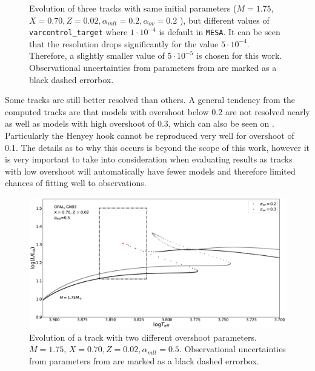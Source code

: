 \begin{figure}[htbp]
    \centering
    \caption{Evolution of three tracks with same initial parameters ($M= 1.75$\msun,$X=0.70, Z=0.02, \alpha_{mlt} = 0.2, \alpha_{ov} = 0.2$ ), but different values of \texttt{varcontrol\_target} where $1\cdot10^{-4}$ is default in \texttt{MESA}. It can be seen that the resolution drops significantly for the value $5\cdot10^{-4}$. Therefore, a slightly smaller value of $5\cdot10^{-5}$ is chosen for this work. Observational uncertainties from parameters from \citet{lenz2010delta} are marked as a black dashed errorbox. }
    \label{varcontrol}
\end{figure}


Some tracks are still better resolved than others. A general tendency from the computed tracks are that models with overshoot below 0.2 are not resolved nearly as well as models with high overshoot of 0.3, which can also be seen on . Particularly the Henyey hook cannot be reproduced very well for overshoot of 0.1. The details as to why this occurs is beyond the scope of this work, however it is very important to take into consideration when evaluating results as tracks with low overshoot will automatically have fewer models and therefore limited chances of fitting well to observations. 

\begin{figure}[htbp]
    \centering
    \includegraphics[width=1\textwidth]{resolution_overshoot.eps}
    \caption{Evolution of a track with two different overshoot parameters. $M= 1.75$\msun, $X=0.70, Z=0.02, \alpha_{mlt} = 0.5$.  Observational uncertainties from parameters from \citet{lenz2010delta} are marked as a black dashed errorbox.}
    \label{ovresol}
  \end{figure}


